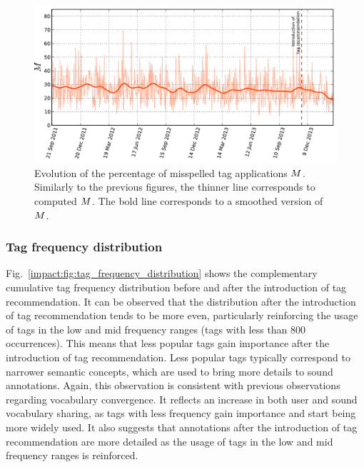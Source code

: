\begin{figure}
\centerline{\includegraphics[width=\figSizeMax]{ch05_impact/pics/fig99_misspelled_tag_applications}}
\caption[Evolution of the percentage of misspelled tag applications]{Evolution of the percentage of misspelled tag applications $M$. Similarly to the previous figures, the thinner line corresponds to computed $M$. The bold line corresponds to a smoothed version of $M$.
}
\label{impact:fig:misspelled_tag_applications}
\end{figure}



\subsubsection{Tag frequency distribution} 

Fig.~\ref{impact:fig:tag_frequency_distribution} shows the complementary cumulative tag frequency distribution before and after the introduction of tag recommendation. It can be observed that the distribution after the introduction of tag recommendation tends to be more even, particularly reinforcing the usage of tags in the low and mid frequency ranges (tags with less than 800 occurrences). This means that less popular tags gain importance after the introduction of tag recommendation. Less popular tags typically correspond to narrower semantic concepts, which are used to bring more details to sound annotations. Again, this observation is consistent with previous observations regarding vocabulary convergence. It reflects an increase in both user and sound vocabulary sharing, as tags with less frequency gain importance and start being more widely used. It also suggests that annotations after the introduction of tag recommendation are more detailed as the usage of tags in the low and mid frequency ranges is reinforced.

